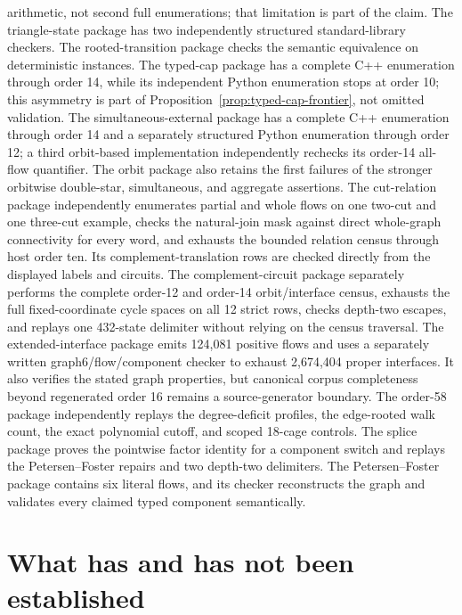 \documentclass[11pt]{article}
\theoremstyle{definition}
\theoremstyle{remark}
\begin{document}
arithmetic, not second full enumerations; that limitation is part of the
claim.  The triangle-state package has two independently structured
standard-library checkers.  The rooted-transition package checks the
semantic equivalence on deterministic instances.  The typed-cap package
has a complete C++ enumeration through order 14, while its independent
Python enumeration stops at order 10; this asymmetry is part of
Proposition~\ref{prop:typed-cap-frontier}, not omitted validation.
The simultaneous-external package has a complete C++ enumeration through
order 14 and a separately structured Python enumeration through order 12;
a third orbit-based implementation independently rechecks its order-14
all-flow quantifier.  The orbit package also retains the first failures of
the stronger orbitwise double-star, simultaneous, and aggregate assertions.
The cut-relation package independently enumerates partial and whole flows on
one two-cut and one three-cut example, checks the natural-join mask against
direct whole-graph connectivity for every word, and exhausts the bounded
relation census through host order ten.  Its complement-translation rows
are checked directly from the displayed labels and circuits.
The complement-circuit package separately performs the complete order-12
and order-14 orbit/interface census, exhausts the full fixed-coordinate
cycle spaces on all 12 strict rows, checks depth-two escapes, and replays one
432-state delimiter without relying on the census traversal.
The extended-interface package emits 124,081 positive flows and uses a
separately written graph6/flow/component checker to exhaust 2,674,404 proper
interfaces.  It also verifies the stated graph properties, but canonical
corpus completeness beyond regenerated order 16 remains a source-generator
boundary.
The order-58 package independently replays the degree-deficit profiles,
the edge-rooted walk count, the exact polynomial cutoff, and scoped
18-cage controls.  The splice package proves the pointwise factor identity
for a component switch and replays the Petersen--Foster repairs and two
depth-two delimiters.  The
Petersen--Foster package contains six literal flows, and its checker
reconstructs the graph and validates every
claimed typed component semantically.

\section{What has and has not been established}
\end{document}

